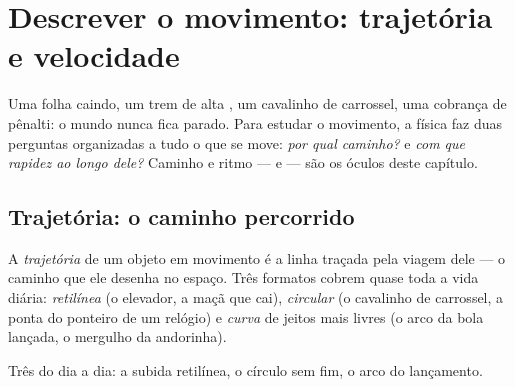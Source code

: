 \chapter{Descrever o movimento: trajetória e velocidade}\label{ch:g6:describing-motion}

Uma folha caindo, um trem de alta , um cavalinho de
carrossel, uma cobrança de pênalti: o mundo nunca fica parado. Para
estudar o movimento, a física faz duas perguntas organizadas a tudo o
que se move: \emph{por qual caminho?} e \emph{com que rapidez ao
longo dele?} Caminho e ritmo ---  e  --- são os
óculos deste capítulo.

\section{Trajetória: o caminho percorrido}

\begin{definition}[Trajetória]\label{def:g6:describing-motion:trajectory}
A \emph{trajetória} de um objeto em movimento é a
linha traçada pela viagem dele --- o caminho que ele desenha no
espaço. Três formatos cobrem quase toda a vida diária:
\emph{retilínea} (o elevador, a maçã que
cai), \emph{circular} (o cavalinho de
carrossel, a ponta do ponteiro de um relógio) e \emph{curva} de
jeitos mais livres (o arco da bola lançada, o mergulho da andorinha).
\end{definition}

\begin{omfigure}

{\small Três  do dia a dia: a subida retilínea, o círculo
sem fim, o arco do lançamento.}
\end{omfigure}

